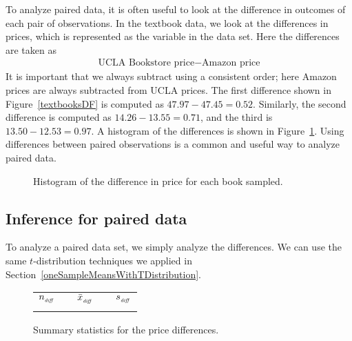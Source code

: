 To analyze paired data, it is often useful to look
at the difference in outcomes of each pair of observations.
In the textbook data, we look at the differences
in prices, which is represented as the
 variable
in the data set.
Here the differences are taken as
\begin{align*}
\text{UCLA Bookstore price} - \text{Amazon price}
\end{align*}
It is important that we always subtract using
a consistent order;
here Amazon prices are always subtracted from UCLA prices.
The first difference shown in Figure~\ref{textbooksDF}
is computed as $47.97 - 47.45 = 0.52$.
Similarly, the second difference is computed as
$14.26 - 13.55 = 0.71$,
 and the third is $13.50 - 12.53 = 0.97$.
A histogram of the differences is shown in
Figure~\ref{diffInTextbookPricesF18}.
Using differences between paired observations
is a common and useful way to analyze paired data.

\begin{figure}[h]
  \centering
  \caption{Histogram of the difference in price for
      each book sampled.}
  \label{diffInTextbookPricesF18}
\end{figure}


\subsection{Inference for paired data}

To analyze a paired data set,
we simply analyze the differences.
We can use the same $t$-distribution techniques
we applied in
Section~\ref{oneSampleMeansWithTDistribution}.

\begin{figure}[h]
\centering
\begin{tabular}{ccccc}
\hline
$n_{_{\text{\emph{diff}}}}$	&\hspace{3mm}& $\bar{x}_{_{\text{\emph{diff}}}}$	&\hspace{3mm}& $s_{_{\text{\emph{diff}}}}$ \vspace{1mm}\\
\uclabookN{}  && \uclabookM{}  && \uclabookSD{} \\
\hline
\end{tabular}
\caption{Summary statistics for the \uclabookN{} price differences.}
\label{textbooksSummaryStats}
\end{figure}


